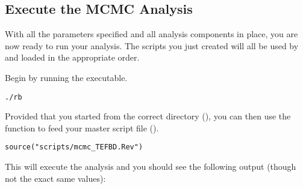 \bigskip
\subsection{Execute the MCMC Analysis}\label{subsect:Exercise-RunMCMC}

With all the parameters specified and all analysis components in place, you are now ready to run your analysis. 
The \Rev scripts you just created will all be used by \RevBayes and loaded in the appropriate order.

Begin by running the \RevBayes executable.
{\tt \begin{snugshade*}
\begin{lstlisting}
./rb
\end{lstlisting}
\end{snugshade*}}

Provided that you started \RevBayes from the correct directory (), you can then use the  function to feed \RevBayes your master script file ().
{\tt \begin{snugshade*}
\begin{lstlisting}
source("scripts/mcmc_TEFBD.Rev")
\end{lstlisting}
\end{snugshade*}}

This will execute the analysis and you should see the following output (though not the exact same values):

